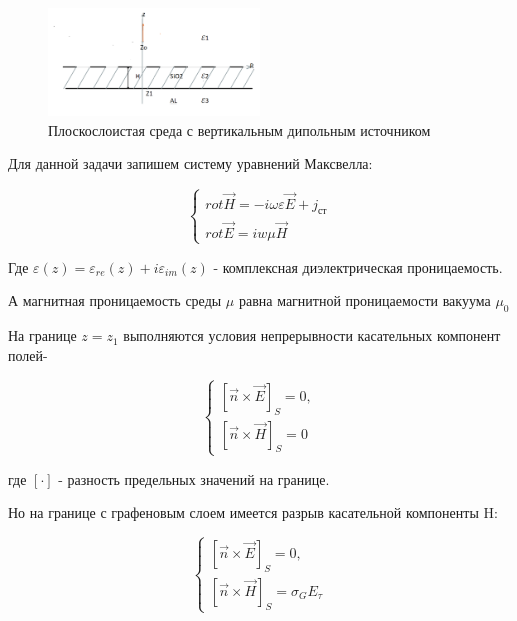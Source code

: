 	\begin{figure}[h] %
		\centering %
		\includegraphics[width=0.5\textwidth]{Рис 1 Вертикальный.PNG} %
		\caption{Плоскослоистая среда с вертикальным дипольным источником} %
		\label{fig:example} %
	\end{figure}
	
	Для данной задачи запишем систему уравнений Максвелла:
	
	
	\begin{equation}
		\begin{cases} rot \vec{H} = -i \omega \varepsilon \vec{E} + j_{ст} \\ rot \vec{E} = iw\mu \vec{H} \end{cases}
	\end{equation}
	
	Где $\varepsilon(z) = \varepsilon_{re}(z) + i \varepsilon_{im}(z)$ - комплексная диэлектрическая проницаемость.
	
	А магнитная проницаемость среды $\mu$ равна магнитной проницаемости вакуума $\mu_0$
	
	На границе $z = z_1$ выполняются условия непрерывности касательных компонент полей-
	
	\begin{equation}
		\begin{cases} [\vec{n} \times \vec{E} ]_S = 0, \\ [\vec{n} \times \vec{H}]_S = 0 \end{cases}
	\end{equation}
	
	где $[\cdot]$ - разность предельных значений на границе. 
	
	\newpage
	
	Но на границе с графеновым слоем имеется разрыв касательной компоненты H:
	
	\begin{equation*}
		\tag{2.1}
		\begin{cases} 
			[\vec{n} \times \vec{E} ]_S = 0, \\ 
			[\vec{n} \times \vec{H}]_S = \sigma_G E_{\tau} 
		\end{cases}
	\end{equation*}
	

